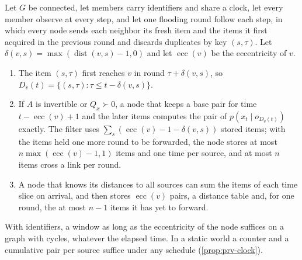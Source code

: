 \begin{proposition}\label{prop:prv-ledger}
Let $G$ be connected, let members carry identifiers and share a clock, let every member observe at every step, and let one flooding round follow each step, in which every node sends each neighbor its fresh item and the items it first acquired in the previous round and discards duplicates by key $(s,\tau)$. Let $\delta(v,s)=\max(\operatorname{dist}(v,s)-1,0)$ and let $\operatorname{ecc}(v)$ be the eccentricity of $v$.
\begin{enumerate}
\item[(a)] The item $(s,\tau)$ first reaches $v$ in round $\tau+\delta(v,s)$, so $D_v(t)=\{(s,\tau):\tau\le t-\delta(v,s)\}$.
\item[(b)] If $A$ is invertible or $Q_x\succ0$, a node that keeps a base pair for time $t-\operatorname{ecc}(v)+1$ and the later items computes the pair of $p(x_t\mid o_{D_v(t)})$ exactly. The filter uses $\sum_s(\operatorname{ecc}(v)-1-\delta(v,s))$ stored items; with the items held one more round to be forwarded, the node stores at most $n\max(\operatorname{ecc}(v)-1,1)$ items and one time per source, and at most $n$ items cross a link per round.
\item[(c)] A node that knows its distances to all sources can sum the items of each time slice on arrival, and then stores $\operatorname{ecc}(v)$ pairs, a distance table and, for one round, the at most $n-1$ items it has yet to forward.
\end{enumerate}
\end{proposition}

With identifiers, a window as long as the eccentricity of the node suffices on a graph with cycles, whatever the elapsed time. In a static world a counter and a cumulative pair per source suffice under any schedule (\cref{prop:prv-clock}).

